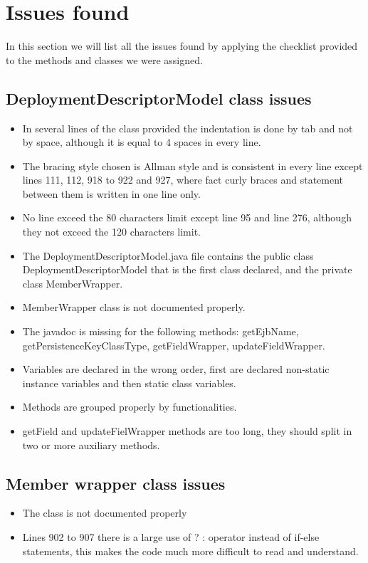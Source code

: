 \section{Issues found}
In this section we will list all the issues found by applying the checklist provided to the methods and classes we were assigned.

\subsection{DeploymentDescriptorModel class issues}
\begin{itemize}
	\item In several lines of the class provided the indentation is done by tab and not by space, although it is equal to 4 spaces in every line.
	\item The bracing style chosen is Allman style and is consistent in every line except lines 111, 112, 918 to 922 and 927, where fact curly braces and statement between them is written in one line only. 
	\item No line exceed the 80 characters limit except line 95 and line 276, although they not exceed the 120 characters limit.
	\item The DeploymentDescriptorModel.java file contains the public class DeploymentDescriptorModel that is the first class declared, and the private class MemberWrapper.
	\item MemberWrapper class is not documented properly.
	\item The javadoc is missing for the following methods: getEjbName, getPersistenceKeyClassType, getFieldWrapper, updateFieldWrapper.
	\item Variables are declared in the wrong order, first are declared non-static instance variables and then static class variables.
	\item Methods are grouped properly by functionalities.
	\item getField and updateFielWrapper methods are too long, they should split in two or more auxiliary methods.
\end{itemize}

\subsection{Member wrapper class issues}
\begin{itemize}
	\item The class is not documented properly
	\item Lines 902 to 907 there is a large use of ? : operator instead of if-else statements, this makes the code much more difficult to read and understand.
\end{itemize}

